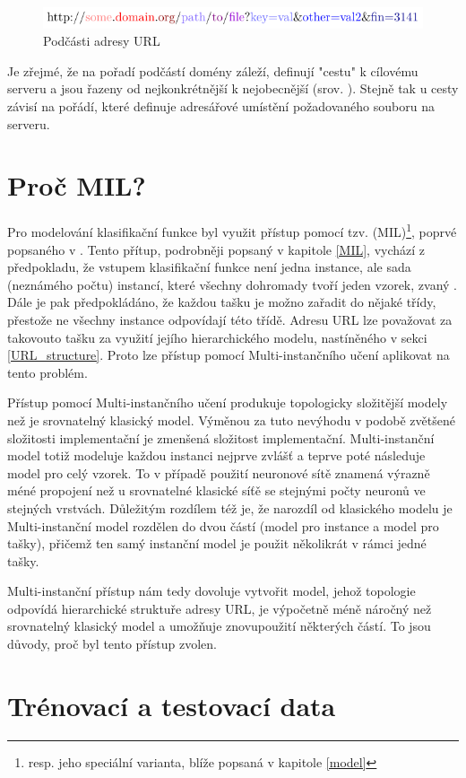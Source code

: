 \begin{figure}[h]
	\caption{Podčásti adresy URL}\label{url_subparts}
	\centering
	\includegraphics{images/url_subparts/url_subparts.pdf}
\end{figure}

Je zřejmé, že na pořadí podčástí domény záleží, definují "cestu" k cílovému serveru a jsou řazeny od nejkonkrétnější k nejobecnější (srov. \cite{mockapetris_domain_1987}).	Stejně tak u cesty závisí na pořádí, které definuje adresářové umístění požadovaného souboru na serveru.

\section{Proč MIL?}

Pro modelování klasifikační funkce byl využit přístup pomocí tzv.  (MIL)\footnote{resp. jeho speciální varianta, blíže popsaná v kapitole \ref{model}}, poprvé popsaného v \cite{dietterich_solving_1997}. Tento přítup, podrobněji popsaný v kapitole \ref{MIL}, vychází z předpokladu, že vstupem klasifikační funkce není jedna instance, ale sada (neznámého počtu) instancí, které všechny dohromady tvoří jeden vzorek, zvaný . Dále je pak předpokládáno, že každou tašku je možno zařadit do nějaké třídy, přestože ne všechny instance odpovídají této třídě. Adresu URL lze považovat za takovouto tašku za využití jejího hierarchického modelu, nastíněného v sekci \ref{URL_structure}. Proto lze přístup pomocí Multi-instančního učení aplikovat na tento problém.

Přístup pomocí Multi-instančního učení produkuje topologicky složitější modely než je srovnatelný klasický model. Výměnou za tuto nevýhodu v podobě zvětšené složitosti implementační je zmenšená složitost implementační. Multi-instanční model totiž modeluje každou instanci nejprve zvlášť a teprve poté následuje model pro celý vzorek. To v případě použití neuronové sítě znamená výrazně méné propojení než u srovnatelné klasické síťě se stejnými počty neuronů ve stejných vrstvách. Důležitým rozdílem též je, že narozdíl od klasického modelu je Multi-instanční model rozdělen do dvou částí (model pro instance a model pro tašky), přičemž ten samý instanční model je použit několikrát v rámci jedné tašky.

Multi-instanční přístup nám tedy dovoluje vytvořit model, jehož topologie odpovídá hierarchické struktuře adresy URL, je výpočetně méně náročný než srovnatelný klasický model a umožňuje znovupoužití některých částí. To jsou důvody, proč byl tento přístup zvolen.

\section{Trénovací a testovací data}

